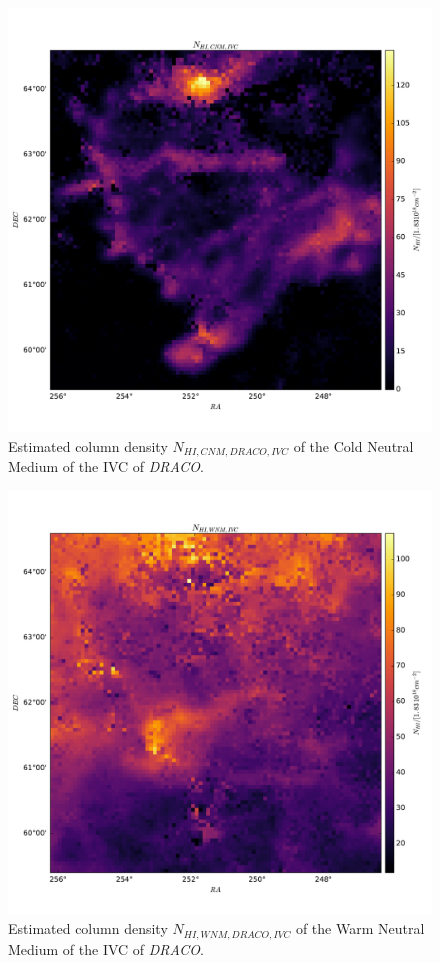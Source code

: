 \documentclass[traditabstract]{aa}
\begin{document}
\begin{figure}
   \includegraphics[width=\linewidth]{Figures/NHI_obs_CNM_IVC.pdf}
   \caption{Estimated column density $N_{HI, CNM, \textit{DRACO}, IVC}$ of the Cold Neutral Medium of the IVC of \textit{DRACO}.}
   \label{fig::NHI_obs_CNM_IVC}
\end{figure}
\begin{figure}
   \includegraphics[width=\linewidth]{Figures/NHI_obs_WNM_IVC.pdf}
   \caption{Estimated column density $N_{HI, WNM, \textit{DRACO}, IVC}$ of the Warm Neutral Medium of the IVC of \textit{DRACO}.}
   \label{fig::NHI_obs_WNM_IVC}
\end{figure}
\end{document}
